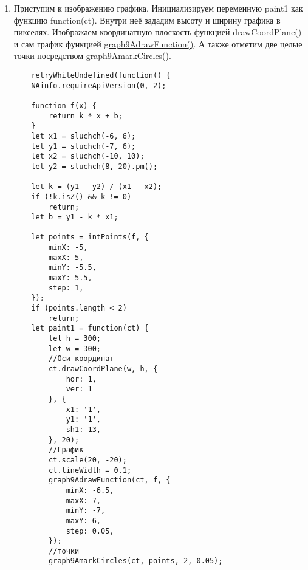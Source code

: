 \begin{enumerate}
\begin{lstlisting}
                    function f(x) {
                        return k * x + b;
                    }
                    let x1 = sluchch(-6, 6);
                    let y1 = sluchch(-7, 6);
                    let x2 = sluchch(-10, 10);
                    let y2 = sluchch(8, 20).pm();
        
                    let k = (y1 - y2) / (x1 - x2);
                    if (!k.isZ() && k != 0)
                        return;
                    let b = y1 - k * x1;
                        let points = intPoints(f, {
                            minX: -5,
                            maxX: 5,
                            minY: -5.5,
                            maxY: 5.5,
                            step: 1,
                        });
                    if (points.length < 2)
                        return;
                    chas2.task.modifiers.addCanvasIllustration({
                        width: 300,
                        height: 300,
                        paint: paint1,
                    });
                    return true;
                }, 100000);
        
                let k = (y1 - y2) / (x1 - x2);
                if (!k.isZ() && k != 0)
                    return;
                let b = y1 - k * x1;
                chas2.task.modifiers.addCanvasIllustration({
                    width: 300,
                    height: 300,
                    paint: paint1,
                });
                return true;
            }, 100000);
        \end{lstlisting}
    \item Приступим к изображению графика. Инициализируем переменную paint1 как функцию function(ct). Внутри неё зададим высоту и ширину графика в пикселях.
          Изображаем координатную плоскость функцией \hyperlink{drawCoordPlane}{drawCoordPlane()} и сам график функцией
          \hyperlink{graph9AdrawFunction}{graph9AdrawFunction()}. А также отметим две целые точки посредством \hyperlink{graph9AmarkCircles}{graph9AmarkCircles()}.
          \begin{lstlisting}
    retryWhileUndefined(function() {
	NAinfo.requireApiVersion(0, 2);

	function f(x) {
		return k * x + b;
	}
	let x1 = sluchch(-6, 6);
	let y1 = sluchch(-7, 6);
	let x2 = sluchch(-10, 10);
	let y2 = sluchch(8, 20).pm();

	let k = (y1 - y2) / (x1 - x2);
	if (!k.isZ() && k != 0)
		return;
	let b = y1 - k * x1;

	let points = intPoints(f, {
		minX: -5,
		maxX: 5,
		minY: -5.5,
		maxY: 5.5,
		step: 1,
	});
	if (points.length < 2)
		return;
	let paint1 = function(ct) {
		let h = 300;
		let w = 300;
		//Оси координат
		ct.drawCoordPlane(w, h, {
			hor: 1,
			ver: 1
		}, {
			x1: '1',
			y1: '1',
			sh1: 13,
		}, 20);
		//График
		ct.scale(20, -20);
		ct.lineWidth = 0.1;
		graph9AdrawFunction(ct, f, {
			minX: -6.5,
			maxX: 7,
			minY: -7,
			maxY: 6,
			step: 0.05,
		});
		//точки
		graph9AmarkCircles(ct, points, 2, 0.05);


\end{lstlisting}
\end{enumerate}
